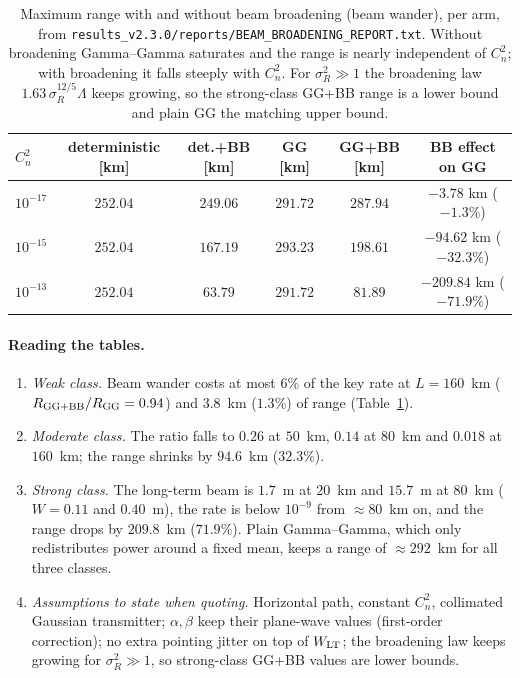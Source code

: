 \documentclass[11pt,a4paper]{article}
\theoremstyle{plain}
\theoremstyle{remark}
\begin{document}
\begin{table}[htbp]
\centering\small
\caption{Maximum range with and without beam broadening (beam wander), per arm, from \texttt{results\_v2.3.0/reports/BEAM\_BROADENING\_REPORT.txt}. Without broadening Gamma--Gamma saturates and the range is nearly independent of $C_n^2$; with broadening it falls steeply with $C_n^2$. For $\sigma_R^2\gg1$ the broadening law $1.63\,\sigma_R^{12/5}\Lambda$ keeps growing, so the strong-class GG+BB range is a lower bound and plain GG the matching upper bound.}
\label{tab:bw-range}
\begin{tabular}{lccccc}
\toprule
$C_n^2$ & deterministic [km] & det.+BB [km] & GG [km] & GG+BB [km] & BB effect on GG \\
\midrule
$10^{-17}$ & $252.04$ & $249.06$ & $291.72$ & $287.94$ & $-3.78$ km ($-1.3\%$) \\
$10^{-15}$ & $252.04$ & $167.19$ & $293.23$ & $198.61$ & $-94.62$ km ($-32.3\%$) \\
$10^{-13}$ & $252.04$ & $63.79$ & $291.72$ & $81.89$ & $-209.84$ km ($-71.9\%$) \\
\bottomrule
\end{tabular}
\end{table}

\paragraph{Reading the tables.}
\begin{enumerate}
\item \emph{Weak class.} Beam wander costs at most $6\%$ of the key rate at $L=160$~km ($R_{\rm GG+BB}/R_{\rm GG}=0.94$) and $3.8$~km ($1.3\%$) of range (Table~\ref{tab:bw-range}).
\item \emph{Moderate class.} The ratio falls to $0.26$ at $50$~km, $0.14$ at $80$~km and $0.018$ at $160$~km; the range shrinks by $94.6$~km ($32.3\%$).
\item \emph{Strong class.} The long-term beam is $1.7$~m at $20$~km and $15.7$~m at $80$~km ($W=0.11$ and $0.40$~m), the rate is below $10^{-9}$ from $\approx80$~km on, and the range drops by $209.8$~km ($71.9\%$). Plain Gamma--Gamma, which only redistributes power around a fixed mean, keeps a range of $\approx292$~km for all three classes.
\item \emph{Assumptions to state when quoting.} Horizontal path, constant $C_n^2$, collimated Gaussian transmitter; $\alpha,\beta$ keep their plane-wave values (first-order correction); no extra pointing jitter on top of $W_{\rm LT}$; the broadening law keeps growing for $\sigma_R^2\gg1$, so strong-class GG+BB values are lower bounds.
\end{enumerate}
\end{document}
